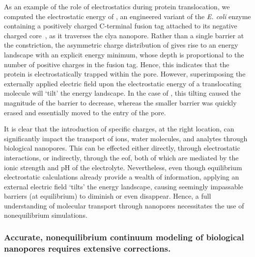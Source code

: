 As an example of the role of electrostatics during protein translocation, we computed the electrostatic
energy of \DHFRt{}, an engineered variant of the \textit{E. coli}  enzyme containing a
positively charged C-terminal fusion tag attached to its negative charged core~\cite{Soskine-Biesemans-2015},
as it traverses the \gls{clya} nanopore. Rather than a single barrier at the constriction, the asymmetric
charge distribution of \DHFRt{} gives rise to an energy landscape with an explicit energy minimum, whose depth
is proportional to the number of positive charges in the fusion tag. Hence, this indicates that the protein is
electrostatically trapped within the pore. However, superimposing the externally applied electric field upon
the electrostatic energy of a translocating molecule will `tilt' the energy landscape. In the case of
\DHFRt{}, this tilting caused the magnitude of the \transi{} barrier to decrease, whereas the smaller \cisi{}
barrier was quickly erased and essentially moved to the \cisi{} entry of the pore.

It is clear that the introduction of specific charges, at the right location, can significantly impact the
transport of ions, water molecules, and analytes through biological nanopores. This can be effected either
directly, through electrostatic interactions, or indirectly, through the \gls{eof}, both of which are mediated
by the ionic strength and pH of the electrolyte. Nevertheless, even though equilibrium electrostatic
calculations already provide a wealth of information, applying an external electric field `tilts' the energy
landscape, causing seemingly impassable barriers (at equilibrium) to diminish or even disappear. Hence, a full
understanding of molecular transport through nanopores necessitates the use of nonequilibrium simulations.


\subsubsection{Accurate, nonequilibrium continuum modeling of biological nanopores requires extensive corrections.}
%

